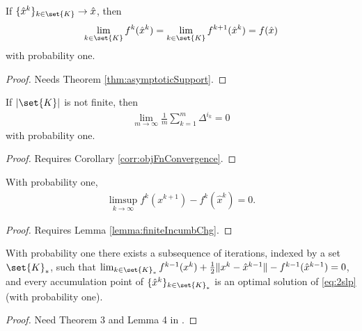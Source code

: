 \documentclass[11pt]{article}
\begin{document}
\begin{corollary} \label{corr:objFnConvergence}
If $\{\hat{x}^k\}_{k \in \set{K}} \rightarrow \hat{x}$, then 
\begin{align}
	\lim_{k \in \set{K}} f^k(\hat{x}^k) = \lim_{k \in \set{K}} f^{k+1}(\hat{x}^k) = f(\hat{x})
\end{align}
with probability one.
\end{corollary}
\begin{proof}
Needs Theorem \ref{thm:asymptoticSupport}.
\end{proof}

\begin{lemma} \label{lemma:finiteIncumbChg}
If $|\set{K}|$ is not finite, then 
\begin{align}
	\lim_{m \rightarrow \infty} \frac{1}{m} \sum_{k = 1}^m \Delta^{i_k} = 0
\end{align}
with probability one.
\end{lemma}
\begin{proof}
Requires Corollary \ref{corr:objFnConvergence}.
\end{proof}



\begin{theorem} \label{thm:objFnConvergence}
With probability one,
\begin{align}
	\limsup_{k \rightarrow \infty} f^k(x^{k+1}) - f^k(\hat{x}^k) = 0.
\end{align}
\end{theorem}
\begin{proof}
Requires Lemma \ref{lemma:finiteIncumbChg}.
\end{proof}

\begin{theorem}
With probability one there exists a subsequence of iterations, indexed by a set $\set{K}_*$, such that $\lim_{k \in \set{K}_*} f^{k-1}(x^k) + \frac{1}{2}\|x^k - \hat{x}^{k-1}\| - f^{k-1}(\hat{x}^{k-1}) = 0$, and every accumulation point of $\{\hat{x}^k\}_{k \in \set{K}_*}$ is an optimal solution of \eqref{eq:2slp} (with probability one).
\end{theorem}
\begin{proof}
Need Theorem 3 and Lemma 4 in \cite{Higle1994}.
\end{proof}



\end{document}

